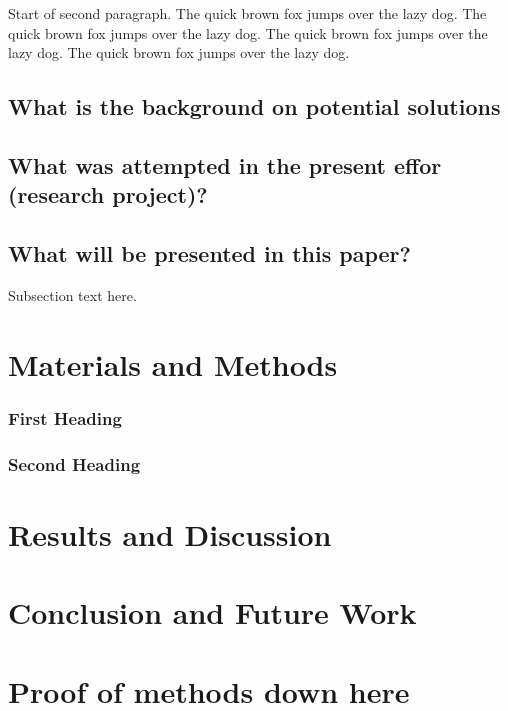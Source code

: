 \documentclass[journal]{./IEEE/IEEEtran}
\begin{document}
Start of second paragraph. The quick brown fox jumps over the lazy dog. The quick
brown fox jumps over the lazy dog. The quick brown fox jumps over the lazy dog. The
quick brown fox jumps over the lazy dog.

\subsection{What is the background on potential solutions}

\subsection{What was attempted in the present effor (research project)?}

\subsection{What will be presented in this paper?}
Subsection text here.

\section{Materials and Methods}

\subsubsection{First Heading}
\subsubsection{Second Heading}

\section{Results and Discussion}
\section{Conclusion and Future Work}
\appendices

\section{Proof of methods down here}

\section{}
\end{document}
